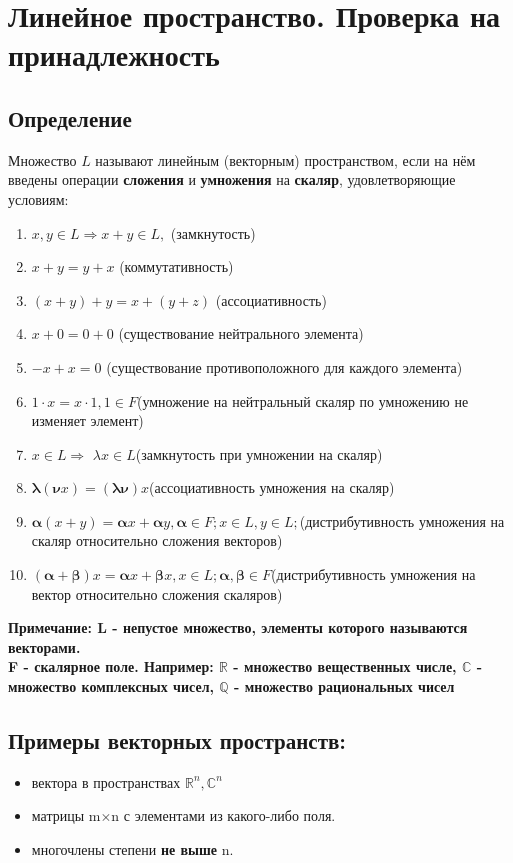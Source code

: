 \documentclass[12pt]{article}
\begin{document}
\section{Линейное пространство. Проверка на принадлежность}
\subsection{Определение}
Множество $L$ называют линейным (векторным) пространством, если на нём введены операции \textbf{ сложения} и {\bf умножения} на {\bf скаляр}, удовлетворяющие условиям:
\begin{enumerate}
    \item $x,y \in L \Rightarrow x + y \in L, $ (замкнутость)
    \item $x+y = y+x $ (коммутативность)
    \item $(x+y)+y=x+(y+z)$ (ассоциативность)
    \item $x+0=0+0$ (существование нейтрального элемента)
    \item $-x+x=0$ (существование противоположного для каждого элемента)
    \item $1 \cdot x=x \cdot 1, 1 \in F$(умножение на нейтральный скаляр по умножению не изменяет элемент)
    \item $x \in L \Rightarrow $ $\lambda x \in L$(замкнутость при умножении на скаляр)
    \item $\mathbf{\lambda} (\mathbf{\nu} x)=(\mathbf{\lambda \nu})x$(ассоциативность умножения на скаляр)
    \item $\mathbf{\alpha}(x+y)=\mathbf{\alpha}x+\mathbf{\alpha}y, \mathbf{\alpha}\in F; x \in L,y \in L;$(дистрибутивность умножения на скаляр относительно сложения векторов)
    \item $(\mathbf{\alpha}+\mathbf{\beta})x=\mathbf{\alpha}x+\mathbf{\beta}x, x \in L; \mathbf{\alpha} , \mathbf{\beta} \in F$(дистрибутивность умножения на вектор относительно сложения скаляров)

\end{enumerate}
\textbf{Примечание: L - непустое множество, элементы которого называются векторами.}\\
\textbf{F - скалярное поле. Например: $\mathbb{R}$ - множество вещественных числе, $\mathbb{C}$ - множество комплексных чисел, $\mathbb{Q}$ - множество рациональных чисел}
\subsection{Примеры векторных пространств:}
\begin{itemize}
    \item вектора в пространствах $\mathbb{R}^n, \mathbb{C}^n$
    \item матрицы m$\times$n с элементами из какого-либо поля.
    \item многочлены степени {\bf не выше} n.
\end{itemize}
\end{document}
